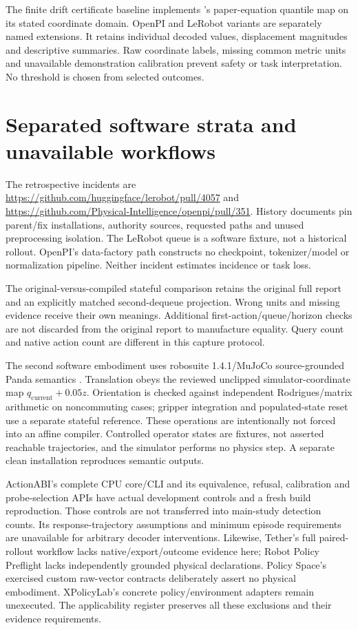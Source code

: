 The finite drift certificate baseline implements \citet{tai2026execspec}'s paper-equation quantile map on its stated coordinate domain. OpenPI and LeRobot variants are separately named extensions. It retains individual decoded values, displacement magnitudes and descriptive summaries. Raw coordinate labels, missing common metric units and unavailable demonstration calibration prevent safety or task interpretation. No threshold is chosen from selected outcomes.

\section{Separated software strata and unavailable workflows}
The retrospective incidents are \url{https://github.com/huggingface/lerobot/pull/4057} and \url{https://github.com/Physical-Intelligence/openpi/pull/351}. History documents pin parent/fix installations, authority sources, requested paths and unused preprocessing isolation. The LeRobot queue is a software fixture, not a historical rollout. OpenPI's data-factory path constructs no checkpoint, tokenizer/model or normalization pipeline. Neither incident estimates incidence or task loss.

The original-versus-compiled stateful comparison retains the original full report and an explicitly matched second-dequeue projection. Wrong units and missing evidence receive their own meanings. Additional first-action/queue/horizon checks are not discarded from the original report to manufacture equality. Query count and native action count are different in this capture protocol.

The second software embodiment uses robosuite 1.4.1/MuJoCo source-grounded Panda semantics \citep{robosuitecode}. Translation obeys the reviewed unclipped simulator-coordinate map $q_{\mathrm{current}}+0.05z$. Orientation is checked against independent Rodrigues/matrix arithmetic on noncommuting cases; gripper integration and populated-state reset use a separate stateful reference. These operations are intentionally not forced into an affine compiler. Controlled operator states are fixtures, not asserted reachable trajectories, and the simulator performs no physics step. A separate clean installation reproduces semantic outputs.

ActionABI's complete CPU core/CLI and its equivalence, refusal, calibration and probe-selection APIs have actual development controls and a fresh build reproduction. Those controls are not transferred into main-study detection counts. Its response-trajectory assumptions and minimum episode requirements are unavailable for arbitrary decoder interventions. Likewise, Tether's full paired-rollout workflow lacks native/export/outcome evidence here; Robot Policy Preflight lacks independently grounded physical declarations. Policy Space's exercised custom raw-vector contracts deliberately assert no physical embodiment. XPolicyLab's concrete policy/environment adapters remain unexecuted. The applicability register preserves all these exclusions and their evidence requirements.

